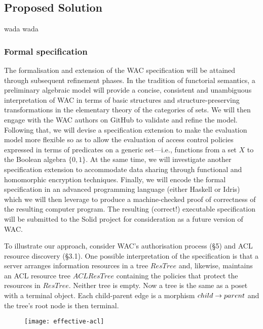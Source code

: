 \subsection{Proposed Solution}

wada wada

\subsubsection{Formal specification}
The formalisation and extension of the WAC specification will be
attained through subsequent refinement phases. In the tradition of
functorial semantics\cite{lawvere1963functorial, bonchi2017functorial},
a preliminary algebraic model will provide a concise, consistent and
unambiguous interpretation of WAC in terms of basic structures and
structure-preserving transformations in the elementary theory of the
categories of sets\cite{lawvere1964elementary, leinster2014rethinking}.
We will then engage with the WAC authors on GitHub to validate and
refine the model. Following that, we will devise a specification extension
to make the evaluation model more flexible so as to allow the evaluation
of access control policies expressed in terms of predicates on a generic
set---i.e., functions from a set $X$ to the Boolean algebra $\{0,1\}$.
At the same time, we will investigate another specification extension
to accommodate data sharing through functional and homomorphic encryption
techniques. Finally, we will encode the formal specification in an
advanced programming language (either Haskell\cite{peytonjones:h98}
or Idris\cite{brady2013idris}) which we will then leverage to produce
a machine-checked proof of correctness of the resulting computer program.
The resulting (correct!) executable specification will be submitted to
the Solid project for consideration as a future version of WAC.

To illustrate our approach, consider WAC's authorisation process (\S 5)
and ACL resource discovery (\S 3.1). One possible interpretation of
the specification is that a server arranges information resources
in a tree $ResTree$ and, likewise, maintains an ACL resource tree
$ACLResTree$ containing the policies that protect the resources in
$ResTree$. Neither tree is empty. Now a tree is the same as a poset
with a terminal object. Each child-parent edge is a morphism
$child \rightarrow parent$ and the tree's root node is then terminal.

\begin{wrapfigure}{r}{0.5\textwidth}
  \texttt{[image: effective-acl]}
\end{wrapfigure}


